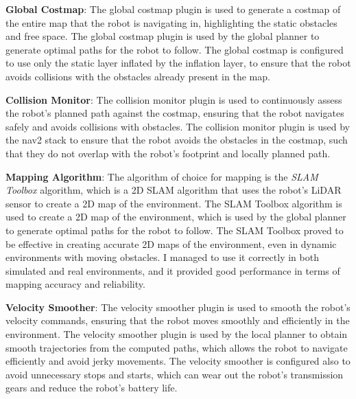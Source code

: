 \textbf{Global Costmap}:
The global costmap plugin is used to generate a costmap of the entire map that the robot is navigating in, highlighting
the static obstacles and free space. The global costmap plugin is used by the global planner to generate optimal paths
for the robot to follow. The global costmap is configured to use only the static layer inflated by the inflation layer,
to ensure that the robot avoids collisions with the obstacles already present in the map.

\textbf{Collision Monitor}:
The collision monitor plugin is used to continuously assess the robot's planned path against the costmap, ensuring
that the robot navigates safely and avoids collisions with obstacles. The collision monitor plugin is used by the
nav2 stack to ensure that the robot avoids the obstacles in the costmap, such that they do not overlap with the robot's
footprint and locally planned path.

\textbf{Mapping Algorithm}:
The algorithm of choice for mapping is the \textit{SLAM Toolbox} algorithm, which is a 2D SLAM algorithm
that uses the robot's LiDAR sensor to create a 2D map of the environment. The SLAM Toolbox algorithm is used to create
a 2D map of the environment, which is used by the global planner to generate optimal paths for the robot to follow.
The SLAM Toolbox proved to be effective in creating accurate 2D maps of the environment, even in dynamic environments
with moving obstacles. I managed to use it correctly in both simulated and real environments, and it provided
good performance in terms of mapping accuracy and reliability.

\textbf{Velocity Smoother}:
The velocity smoother plugin is used to smooth the robot's velocity commands, ensuring that the robot moves smoothly
and efficiently in the environment. The velocity smoother plugin is used by the local planner to obtain smooth
trajectories from the computed paths, which allows the robot to navigate efficiently and avoid jerky movements.
The velocity smoother is configured also to avoid unnecessary stops and starts, which can wear out the robot's transmission
gears and reduce the robot's battery life.

